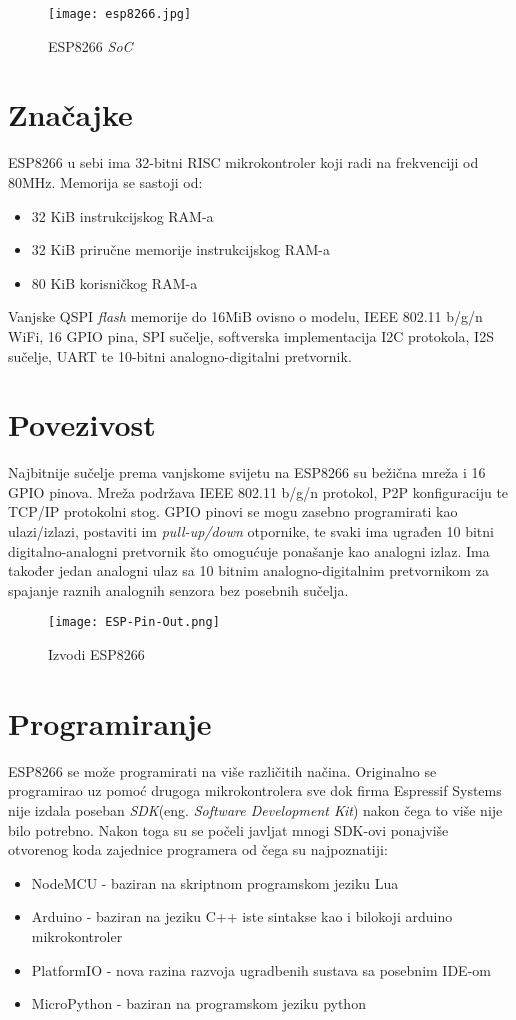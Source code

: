\documentclass[times, utf8, zavrsni]{fer}
\begin{document}
{\begin{figure}[h]
    \centering
    \texttt{[image: esp8266.jpg]}
    \caption{ESP8266 \textit{SoC}}
\end{figure}

\section{Značajke}
ESP8266 u sebi ima 32-bitni RISC mikrokontroler koji radi na frekvenciji od 80MHz.
Memorija se sastoji od:
\begin{itemize}
    \item 32 KiB instrukcijskog RAM-a
    \item 32 KiB priručne memorije instrukcijskog RAM-a
    \item 80 KiB korisničkog RAM-a
\end{itemize}
Vanjske QSPI \textit{flash} memorije do 16MiB ovisno o modelu, IEEE 802.11 b/g/n WiFi, 16 GPIO pina, SPI sučelje, softverska implementacija I2C protokola, I2S sučelje, UART te 10-bitni analogno-digitalni pretvornik.

\section{Povezivost}
Najbitnije sučelje prema vanjskome svijetu na ESP8266 su bežična mreža i 16 GPIO pinova.
Mreža podržava IEEE 802.11 b/g/n protokol, P2P konfiguraciju te TCP/IP protokolni stog.
GPIO pinovi se mogu zasebno programirati kao ulazi/izlazi, postaviti im \textit{pull-up/down} otpornike, te svaki ima ugrađen 10 bitni digitalno-analogni pretvornik što omogućuje ponašanje kao analogni izlaz.
Ima također jedan analogni ulaz sa 10 bitnim analogno-digitalnim pretvornikom za spajanje raznih analognih senzora bez posebnih sučelja.
\begin{figure}[h]
    \centering
    \texttt{[image: ESP-Pin-Out.png]}
    \caption{Izvodi ESP8266}
\end{figure}

\section{Programiranje} 
ESP8266 se može programirati na više različitih načina.
Originalno se programirao uz pomoć drugoga mikrokontrolera sve dok firma Espressif Systems nije izdala poseban \textit{SDK}(eng. \textit{Software Development Kit}) nakon čega to više nije bilo potrebno.
Nakon toga su se počeli javljat mnogi SDK-ovi ponajviše otvorenog koda zajednice programera od čega su najpoznatiji:
    \begin{itemize}
        \item NodeMCU - baziran na skriptnom programskom jeziku Lua
        \item Arduino - baziran na jeziku C++ iste sintakse kao i bilokoji arduino mikrokontroler
        \item PlatformIO - nova razina razvoja ugradbenih sustava sa posebnim IDE-om
        \item MicroPython - baziran na programskom jeziku python
    \end{itemize}

}
\end{document}
